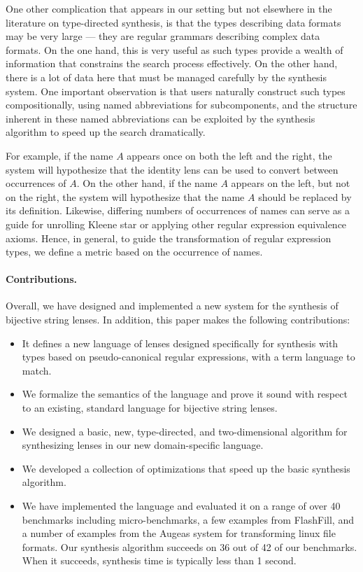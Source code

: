 One other complication that appears in our setting but not elsewhere in
the literature on type-directed synthesis, is that the types 
describing data formats may be very large --- they are regular
grammars describing complex data formats.  On the one hand, this is
very useful as such types provide a wealth of information that constrains
the search process effectively.  On the other hand, there is a lot of
data here that must be managed carefully by the synthesis system.
One important observation is that users naturally construct
such types compositionally, using named abbreviations for subcomponents,
and the structure inherent in these named abbreviations can be 
exploited by the synthesis algorithm to speed up the search dramatically.

For example, if the name $A$ appears once on both the left and the right,
the system will hypothesize that the identity lens can be used to convert
between occurrences of $A$.  On the other hand, if the name $A$ appears
on the left, but not on the right, the system will hypothesize that the
name $A$ should be replaced by its definition.  Likewise, differing
numbers of occurrences of names can serve as a guide for unrolling
Kleene star or applying other regular expression equivalence axioms.
Hence, in general, to guide the transformation of regular expression
types, we define a metric based on the occurrence of names.

\paragraph*{Contributions.}  Overall, we have designed and implemented
a new system for the synthesis of bijective string lenses.
In addition, this paper makes the following contributions:

\begin{itemize}
\item It defines a new language of lenses designed specifically for synthesis
with types based on pseudo-canonical regular expressions, with a term 
language to match.
\item We formalize the semantics of the language and prove it sound with
respect to an existing, standard language for bijective string lenses.
\item We designed a basic, new, type-directed, and two-dimensional 
algorithm for synthesizing lenses in our new domain-specific language.
\item We developed a collection of optimizations that speed up the basic
synthesis algorithm.
\item We have implemented the language and evaluated it on a range of
over 40 benchmarks including micro-benchmarks, a few examples from FlashFill,
and a number of examples from the Augeas system for transforming linux
file formats.  Our synthesis algorithm succeeds on 36 out of 42 of our
benchmarks.  When it succeeds, synthesis time is typically less than 1 second.
\end{itemize}


